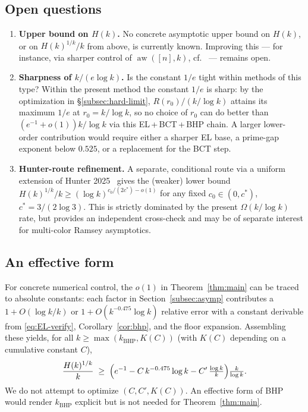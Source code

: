 \documentclass[11pt,reqno,a4paper]{amsart}
\theoremstyle{plain}
\theoremstyle{definition}
\theoremstyle{remark}
\numberwithin{equation}{section}
\DeclareMathOperator{\aw}{aw}
\begin{document}
\subsection{Open questions}
\label{subsec:open}

\begin{enumerate}
\item \textbf{Upper bound on $H(k)$.} No concrete asymptotic upper
  bound on $H(k)$, or on $H(k)^{1/k}/k$ from above, is currently
  known. Improving this --- for instance, via sharper control of
  $\aw([n],k)$, cf.~\cite{BEHH2016} --- remains open.
\item \textbf{Sharpness of $k/(e\log k)$.} Is the constant $1/e$
  tight within methods of this type? Within the present method the
  constant $1/e$ is sharp: by the optimization in
  \S\ref{subsec:hard-limit}, $R(r_{0})/(k/\log k)$ attains its
  maximum $1/e$ at $r_{0}=k/\log k$, so no choice of $r_{0}$ can do
  better than $(e^{-1}+o(1))k/\log k$ via this EL\,+\,BCT\,+\,BHP
  chain. A larger lower-order contribution would require either a
  sharper EL base, a prime-gap exponent below $0.525$, or a
  replacement for the BCT step.
\item \textbf{Hunter-route refinement.} A separate, conditional route
  via a uniform extension of Hunter 2025~\cite{Hunter2025} gives the
  (weaker) lower bound
  $H(k)^{1/k}/k\ge(\log k)^{c_{0}/(2c^{*})-o(1)}$ for any fixed
  $c_{0}\in(0,c^{*})$, $c^{*}=3/(2\log 3)$. This is strictly
  dominated by the present $\Omega(k/\log k)$ rate, but provides an
  independent cross-check and may be of separate interest for
  multi-color Ramsey asymptotics.
\end{enumerate}

\subsection{An effective form}
\label{subsec:non-asymp}

For concrete numerical control, the $o(1)$ in Theorem~\ref{thm:main}
can be traced to absolute constants: each factor in
Section~\ref{subsec:asymp} contributes a $1+O(\log k/k)$ or
$1+O(k^{-0.475}\log k)$ relative error with a constant derivable from
\eqref{eq:EL-verify}, Corollary~\ref{cor:bhp}, and the floor
expansion. Assembling these yields, for all
$k\ge\max(k_{\mathrm{BHP}},K(C))$ (with $K(C)$ depending on a
cumulative constant $C$),
\[
\frac{H(k)^{1/k}}{k}\;\ge\;\Bigl(e^{-1}-C\,k^{-0.475}\log k-C'\,\tfrac{\log k}{k}\Bigr)\tfrac{k}{\log k}.
\]
We do not attempt to optimize $(C,C',K(C))$. An effective form of
BHP~\cite{BHP} would render $k_{\mathrm{BHP}}$ explicit but is not
needed for Theorem~\ref{thm:main}.
\end{document}
